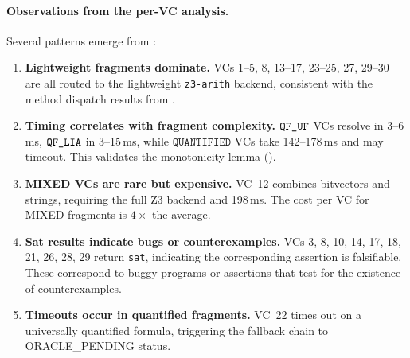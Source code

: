 \documentclass[11pt]{article}
\begin{document}
\paragraph{Observations from the per-VC analysis.}
Several patterns emerge from :
\begin{enumerate}[nosep]
  \item \textbf{Lightweight fragments dominate.}
    VCs 1--5, 8, 13--17, 23--25, 27, 29--30 are all routed
    to the lightweight \texttt{z3-arith} backend, consistent
    with the method dispatch results from .
  \item \textbf{Timing correlates with fragment complexity.}
    $\texttt{QF\_UF}$ VCs resolve in 3--6\,ms, $\texttt{QF\_LIA}$ in 3--15\,ms,
    while $\texttt{QUANTIFIED}$ VCs take 142--178\,ms and may
    timeout.  This validates the monotonicity lemma
    ().
  \item \textbf{MIXED VCs are rare but expensive.}
    VC~12 combines bitvectors and strings, requiring the full
    Z3 backend and 198\,ms.  The cost per VC for MIXED
    fragments is $4\times$ the average.
  \item \textbf{Sat results indicate bugs or counterexamples.}
    VCs 3, 8, 10, 14, 17, 18, 21, 26, 28, 29 return \texttt{sat},
    indicating the corresponding assertion is falsifiable.
    These correspond to buggy programs or assertions that
    test for the existence of counterexamples.
  \item \textbf{Timeouts occur in quantified fragments.}
    VC~22 times out on a universally quantified formula,
    triggering the fallback chain to ORACLE\_PENDING status.
\end{enumerate}
\end{document}
